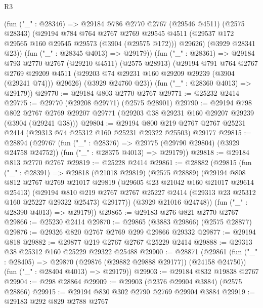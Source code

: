 \begin{lexlean}{R3}
\begin{coremodule}
        (fun ("_" : @28346) =>
        @29184
          @786
          @2770
          @2767
          (@29546 @4511)
          (@2575 @28343)
          (@29194
            @784
            @764
            @2767
            @2769
            @29545
            @4511
            (@29537 @172 @29565 @160 @29545 @29573 (@3904 (@29575 @172)))
            @29626)
          (@3929 @28341 @23))
        (fun ("_" : @28345 @4013) => @29179))
      (fun ("_" : @28361) =>
      @29184
        @793
        @2770
        @2767
        (@29210 @4511)
        (@2575 @28913)
        (@29194
          @791
          @764
          @2767
          @2769
          @29209
          @4511
          (@29203 @74 @29231 @160 @29209 @29239 (@3904 (@29241 @74)))
          @29626)
        (@3929 @24760 @23))
      (fun ("_" : @28360 @4013) => @29179))
@29770 := @29184 @803 @2770 @2767
@29771 := @25232 @2414
@29775 := @29770 (@29208 @29771) (@2575 @28901)
@29790 := @29194
    @798
    @802
    @2767
    @2769
    @29207
    @29771
    (@29203 @38 @29231 @160 @29207 @29239 (@3904 (@29241 @38)))
@29804 := @29194
    @800
    @219
    @2767
    @2767
    @25231
    @2414
    (@29313 @74 @25312 @160 @25231 @29322 @25503)
    @29177
@29815 := @28894
    (@29767
      (fun ("_" : @28376) => @29775 (@29790 @29804) (@3929 @24758 @24752))
      (fun ("_" : @28375 @4013) => @29179))
@29818 := @29184 @813 @2770 @2767
@29819 := @25228 @2414
@29861 := @28882
    (@29815
      (fun ("_" : @28391) =>
      @29818
        (@21018 @29819)
        (@2575 @28889)
        (@29194
          @808
          @812
          @2767
          @2769
          @21017
          @29819
          (@29605 @23 @21042 @160 @21017 @29614 @25413)
          (@29194
            @810
            @219
            @2767
            @2767
            @25227
            @2414
            (@29313 @23 @25312 @160 @25227 @29322 @25473)
            @29177))
        (@3929 @21016 @24748))
      (fun ("_" : @28390 @4013) => @29179))
@29865 := @29183 @276 @821 @2770 @2767
@29866 := @25230 @2414
@29870 := @29865 (@3883 @29866) (@2575 @28877)
@29876 := @29326 @820 @2767 @2769 @299 @29866 @29332
@29877 := @29194 @818
@29882 := @29877 @219 @2767 @2767 @25229 @2414
@29888 := @29313 @38 @25312 @160 @25229 @29322 @25488
@29900 := @28871
    (@29861
      (fun ("_" : @28405) => @29870 (@29876 (@29882 @29888 @29177)) (@24158 @24750))
      (fun ("_" : @28404 @4013) => @29179))
@29903 := @29184 @832 @19838 @2767
@29904 := @298 @28864
@29909 := @29903 (@2376 @29904 @3884) (@2575 @28866)
@29915 := @29194 @830 @302 @2790 @2769 @29904 @3884
@29919 := @29183 @292 @829 @2788 @2767

\end{coremodule}
\end{lexlean}
